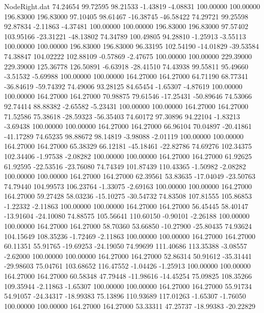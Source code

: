 \begin{filecontents}{NodeRight.dat}
  74.24654   99.72595   98.21533    -1.43819   -4.08831  100.00000  100.00000  196.83000  196.83000   97.10405   98.61467  -16.38745  -46.58422
  74.29721   99.25598   92.87834    -2.11863   -4.37481  100.00000  100.00000  196.83000  196.83000   97.57402  103.95166  -23.31221  -48.13802
  74.34789  100.49805   94.28810    -1.25913   -3.55113  100.00000  100.00000  196.83000  196.83000   96.33195  102.54190  -14.01829  -39.53584
  74.38847  104.02222  102.88109    -0.57869   -2.47675  100.00000  100.00000  229.39000  229.39000  125.36778  126.50891   -6.63918  -28.41510
  74.43938   99.55811   95.49660    -3.51532   -5.69988  100.00000  100.00000  164.27000  164.27000   64.71190   68.77341  -36.84619  -59.74392
  74.49006   93.28125   84.65454    -1.65307   -4.87619  100.00000  100.00000  164.27000  164.27000   70.98875   79.61546  -17.25431  -50.89646
  74.53066   92.74414   88.88382    -2.65582   -5.23431  100.00000  100.00000  164.27000  164.27000   71.52586   75.38618  -28.59323  -56.35403
  74.60172   97.30896   94.22104    -1.83213   -3.69438  100.00000  100.00000  164.27000  164.27000   66.96104   70.04897  -20.41861  -41.17289
  74.65235   98.88672   98.14819    -3.98088   -2.01119  100.00000  100.00000  164.27000  164.27000   65.38329   66.12181  -45.18461  -22.82786
  74.69276  102.34375  102.34406    -1.97538   -2.08282  100.00000  100.00000  164.27000  164.27000   61.92625   61.92595  -22.53516  -23.76080
  74.74349  101.87439  110.43365    -1.50982   -2.08282  100.00000  100.00000  164.27000  164.27000   62.39561   53.83635  -17.04049  -23.50763
  74.79440  104.99573  106.23764    -1.33075   -2.69163  100.00000  100.00000  164.27000  164.27000   59.27428   58.03236  -15.10275  -30.54732
  74.83508  107.81555  105.86853    -1.22332   -2.11863  100.00000  100.00000  164.27000  164.27000   56.45445   58.40147  -13.91604  -24.10080
  74.88575  105.56641  110.60150    -0.90101   -2.26188  100.00000  100.00000  164.27000  164.27000   58.70360   53.66850  -10.27900  -25.80435
  74.93624  104.15649  108.35236    -1.72469   -2.11863  100.00000  100.00000  164.27000  164.27000   60.11351   55.91765  -19.69253  -24.19050
  74.99699  111.40686  113.35388    -3.08557   -2.62000  100.00000  100.00000  164.27000  164.27000   52.86314   50.91612  -35.31441  -29.98603
  75.04761  103.68652  116.47552    -1.04426   -1.25913  100.00000  100.00000  164.27000  164.27000   60.58348   47.79448  -11.98616  -14.45254
  75.09825  108.35266  109.35944    -2.11863   -1.65307  100.00000  100.00000  164.27000  164.27000   55.91734   54.91057  -24.34317  -18.99383
  75.13896  110.93689  117.01263    -1.65307   -1.76050  100.00000  100.00000  164.27000  164.27000   53.33311   47.25737  -18.99383  -20.22829

\end{filecontents}
